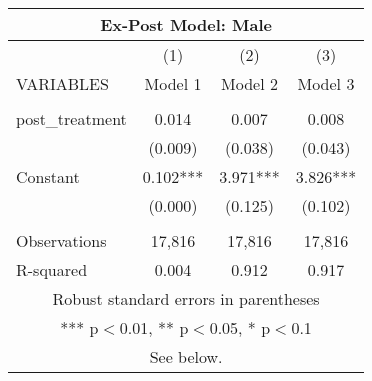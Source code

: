 \begin{tabular}{lccc}
\multicolumn{4}{c}{Ex-Post Model: Male} \\ \hline
 & (1) & (2) & (3) \\
VARIABLES & Model 1 & Model 2 & Model 3 \\ \hline
 &  &  &  \\
post\_treatment & 0.014 & 0.007 & 0.008 \\
 & (0.009) & (0.038) & (0.043) \\
Constant & 0.102*** & 3.971*** & 3.826*** \\
 & (0.000) & (0.125) & (0.102) \\
 &  &  &  \\
Observations & 17,816 & 17,816 & 17,816 \\
 R-squared & 0.004 & 0.912 & 0.917 \\ \hline
\multicolumn{4}{c}{ Robust standard errors in parentheses} \\
\multicolumn{4}{c}{ *** p$<$0.01, ** p$<$0.05, * p$<$0.1} \\
\multicolumn{4}{c}{ See below.} \\
\end{tabular}
